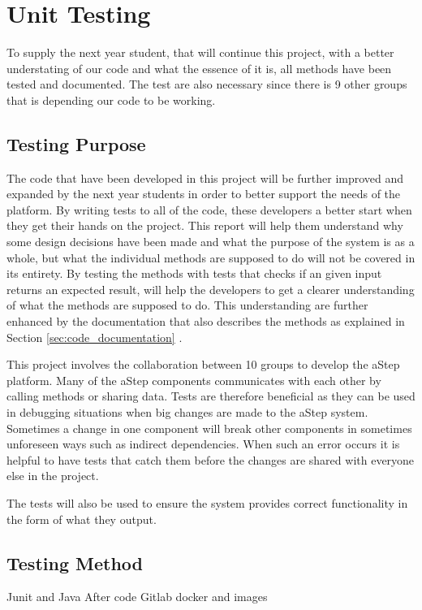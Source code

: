 \section{Unit Testing}
To supply the next year student, that will continue this project, with a better understating of our code and what the essence of it is, all methods have been tested and documented. 
The test are also necessary since there is 9 other groups that is depending our code to be working.

\subsection{Testing Purpose}
The code that have been developed in this project will be further improved and expanded by the next year students in order to better support the needs of the platform. 
By writing tests to all of the code, these developers a better start when they get their hands on the project. 
This report will help them understand why some design decisions have been made and what the purpose of the system is as a whole, but what the individual methods are supposed to do will not be covered in its entirety. 
By testing the methods with tests that checks if an given input returns an expected result, will help the developers to get a clearer understanding of what the methods are supposed to do. 
This understanding are further enhanced by the documentation that also describes the methods as explained in Section \ref{sec:code_documentation} . 

This project involves the collaboration between 10 groups to develop the aStep platform. 
Many of the aStep components communicates with each other by calling methods or sharing data.
Tests are therefore beneficial as they can be used in debugging situations when big changes are made to the aStep system. 
Sometimes a change in one component will break other components in sometimes unforeseen ways such as indirect dependencies.
When such an error occurs it is helpful to have tests that catch them before the changes are shared with everyone else in the project.

The tests will also be used to ensure the system provides correct functionality in the form of what they output.




\subsection{Testing Method}
Junit and Java
After code
Gitlab docker and images

